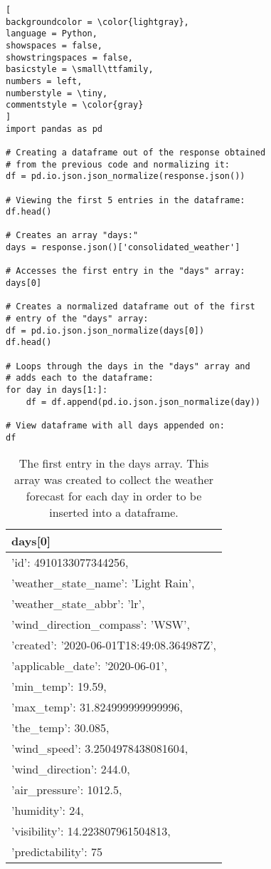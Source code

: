 \documentclass[]{article}
\begin{document}
\begin{lstlisting}[
backgroundcolor = \color{lightgray},
language = Python,
showspaces = false,
showstringspaces = false,
basicstyle = \small\ttfamily,
numbers = left,
numberstyle = \tiny,
commentstyle = \color{gray}
]
import pandas as pd

# Creating a dataframe out of the response obtained
# from the previous code and normalizing it:
df = pd.io.json.json_normalize(response.json())

# Viewing the first 5 entries in the dataframe:
df.head()

# Creates an array "days:"  
days = response.json()['consolidated_weather']

# Accesses the first entry in the "days" array:
days[0]

# Creates a normalized dataframe out of the first
# entry of the "days" array:
df = pd.io.json.json_normalize(days[0])
df.head()

# Loops through the days in the "days" array and
# adds each to the dataframe:
for day in days[1:]:
	df = df.append(pd.io.json.json_normalize(day))

# View dataframe with all days appended on:
df

\end{lstlisting}

\begin{table}[!ht]
	\begin{center}
		\caption{The first entry in the days array.  This array was created to collect the weather forecast for each day in order to be inserted into a dataframe.}
		\label{tab:table1}
		\begin{tabular}{|l|} 
			\hline
			\textbf{days[0]} \\
			\hline
		'id': 4910133077344256,\\
			'weather\_state\_name': 'Light Rain',\\
			'weather\_state\_abbr': 'lr',\\
			'wind\_direction\_compass': 'WSW',\\
			'created': '2020-06-01T18:49:08.364987Z',\\
			'applicable\_date': '2020-06-01',\\
			'min\_temp': 19.59,\\
			'max\_temp': 31.824999999999996,\\
			'the\_temp': 30.085,\\
			'wind\_speed': 3.2504978438081604,\\
			'wind\_direction': 244.0,\\
			'air\_pressure': 1012.5,\\
			'humidity': 24,\\
			'visibility': 14.223807961504813,\\
			'predictability': 75\\
			\hline
		\end{tabular}
	\end{center}
\end{table}
\end{document}
